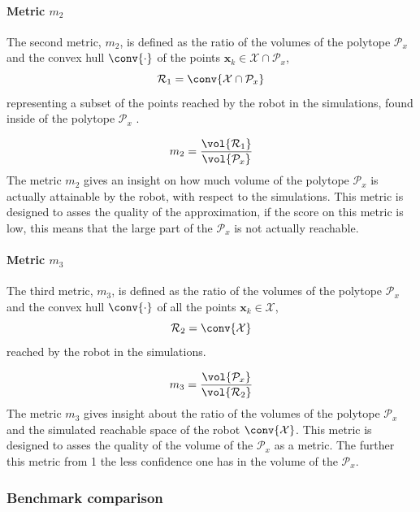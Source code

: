 \paragraph*{Metric $m_2$}  The second metric, $m_2$, is defined as the ratio of the volumes of the polytope $\mathcal{P}_x$ and the convex hull $\conv{\cdot}$ of the points $\bm{x}_k\in\mathcal{X}\cap\mathcal{P}_x$, $$ \mathcal{R}_1 = \conv{\mathcal{X}\cap\mathcal{P}_x}$$ representing a subset of the points reached by the robot in the simulations, found inside of the polytope $\mathcal{P}_x$ .

\begin{equation}
    m_2 = \frac{\vol{ \mathcal{R}_1}}{\vol{\mathcal{P}_x}}
\end{equation}
The metric $m_2$ gives an insight on how much volume of the polytope $\mathcal{P}_x$ is actually attainable by the robot, with respect to the simulations. This metric is designed to asses the quality of the approximation, if the score on this metric is low, this means that the large part of the $\mathcal{P}_x$ is not actually reachable.

\paragraph*{Metric $m_3$}  The third metric, $m_3$, is defined as the ratio of the volumes of the polytope $\mathcal{P}_x$ and the convex hull $\conv{\cdot}$ of all the points $\bm{x}_k\in\mathcal{X}$, $$ \mathcal{R}_2 = \conv{\mathcal{X}}$$ reached by the robot in the simulations.

\begin{equation}
    m_3 = \frac{\vol{\mathcal{P}_x}}{\vol{ \mathcal{R}_2 }}
\end{equation}
The metric $m_3$ gives insight about the ratio of the volumes of the polytope $\mathcal{P}_x$ and the simulated reachable space of the robot $\conv{\mathcal{X}}$. This metric is designed to asses the quality of the volume of the $\mathcal{P}_x$ as a metric. The further this metric from 1 the less confidence one has in the volume of the $\mathcal{P}_x$.

\subsubsection{Benchmark comparison}

